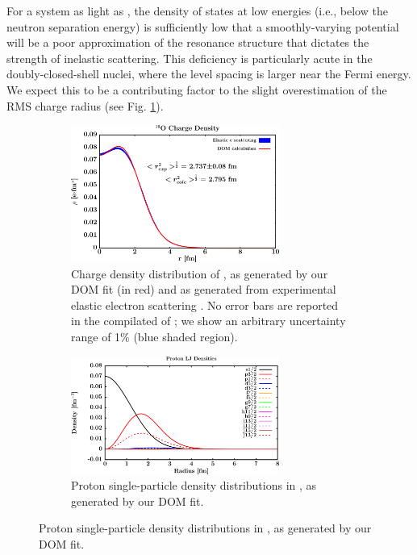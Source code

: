 For a system as light as \oSix, the density of states at low energies (i.e., below the neutron
separation energy) is sufficiently low that a smoothly-varying potential will be a poor
approximation of the resonance structure that dictates the strength of inelastic scattering. This
deficiency is particularly acute in the doubly-closed-shell nuclei, where the level spacing is
larger near the Fermi energy. We expect this to be a contributing factor to the slight
overestimation of the RMS charge radius (see Fig. \ref{o16ChargeDensity}).

\begin{figure}[tb]
    \centering
    \begin{subfigure}[c]{\textwidth}
        \centering
        \includegraphics[width=0.75\textwidth]{figures/o16_chargeDensity.png}
        \caption[Proton single-particle density distributions in \oSix]
        {
            Charge density distribution of \oSix, as generated
            by our DOM fit (in red) and as generated from experimental
            elastic electron scattering \cite{DeVries1987}. No error bars are
            reported in the compilated of \cite{DeVries1987}; we show an
            arbitrary uncertainty range of 1\% (blue shaded region).
        }
        \label{o16ChargeDensity}
    \end{subfigure}\vspace{16pt}
    \begin{subfigure}[c]{\textwidth}
        \centering
        \includegraphics[width=0.75\textwidth]{figures/o16_protonLJDensityDist.png}
        \caption[Proton single-particle density distributions in \oSix]
        {
            Proton single-particle density distributions in \oSix, as generated
            by our DOM fit.
        }
        \label{o16LJDensityDist}
    \end{subfigure}
\end{figure}

